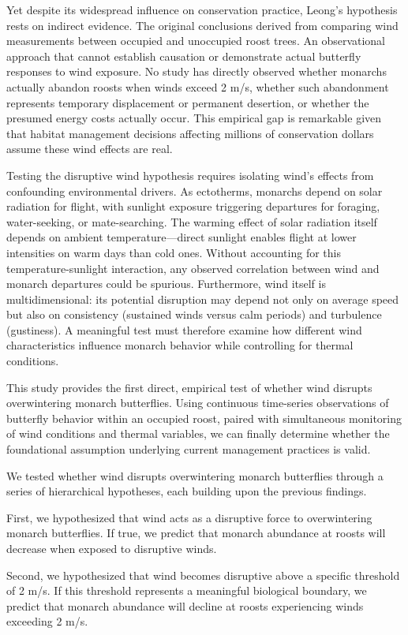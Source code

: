 Yet despite its widespread influence on conservation practice, Leong's hypothesis rests on indirect evidence. The original conclusions derived from comparing wind measurements between occupied and unoccupied roost trees. An observational approach that cannot establish causation or demonstrate actual butterfly responses to wind exposure. No study has directly observed whether monarchs actually abandon roosts when winds exceed 2 m/s, whether such abandonment represents temporary displacement or permanent desertion, or whether the presumed energy costs actually occur. This empirical gap is remarkable given that habitat management decisions affecting millions of conservation dollars assume these wind effects are real.

Testing the disruptive wind hypothesis requires isolating wind's effects from confounding environmental drivers. As ectotherms, monarchs depend on solar radiation for flight, with sunlight exposure triggering departures for foraging, water-seeking, or mate-searching. The warming effect of solar radiation itself depends on ambient temperature—direct sunlight enables flight at lower intensities on warm days than cold ones. Without accounting for this temperature-sunlight interaction, any observed correlation between wind and monarch departures could be spurious. Furthermore, wind itself is multidimensional: its potential disruption may depend not only on average speed but also on consistency (sustained winds versus calm periods) and turbulence (gustiness). A meaningful test must therefore examine how different wind characteristics influence monarch behavior while controlling for thermal conditions.

This study provides the first direct, empirical test of whether wind disrupts overwintering monarch butterflies. Using continuous time-series observations of butterfly behavior within an occupied roost, paired with simultaneous monitoring of wind conditions and thermal variables, we can finally determine whether the foundational assumption underlying current management practices is valid.

We tested whether wind disrupts overwintering monarch butterflies through a series of hierarchical hypotheses, each building upon the previous findings.

First, we hypothesized that wind acts as a disruptive force to overwintering monarch butterflies. If true, we predict that monarch abundance at roosts will decrease when exposed to disruptive winds.

Second, we hypothesized that wind becomes disruptive above a specific threshold of 2 m/s. If this threshold represents a meaningful biological boundary, we predict that monarch abundance will decline at roosts experiencing winds exceeding 2 m/s.

